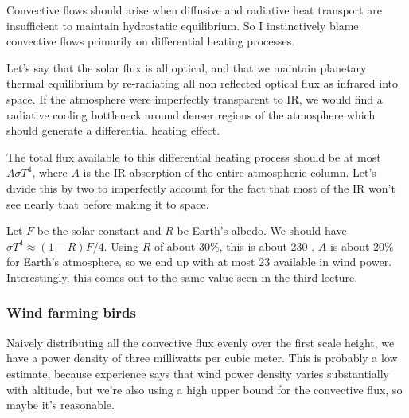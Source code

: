 \documentclass[12pt]{article}
\begin{document}
Convective flows should arise when diffusive and radiative heat transport are insufficient to maintain hydrostatic equilibrium. So I instinctively blame convective flows primarily on differential heating processes.

Let's say that the solar flux is all optical, and that we maintain planetary thermal equilibrium by re-radiating all non reflected optical flux as infrared into space. If the atmosphere were imperfectly transparent to IR, we would find a radiative cooling bottleneck around denser regions of the atmosphere which should generate a differential heating effect.

The total flux available to this differential heating process should be at most \(A \sigma T^4\), where \(A\) is the IR absorption of the entire atmospheric column. Let's divide this by two to imperfectly account for the fact that most of the IR won't see nearly that before making it to space.

Let \(F\) be the solar constant and \(R\) be Earth's albedo. We should have \(\sigma T^4 \approx (1-R)F/4\). Using \(R\) of about 30\%, this is about 230 \wmsq. \(A\) is about 20\% for Earth's atmosphere, so we end up with at most 23 \wmsq available in wind power. Interestingly, this comes out to the same value seen in the third lecture.

\subsubsection{Wind farming birds}

Naively distributing all the convective flux evenly over the first scale height, we have a power density of three milliwatts per cubic meter. This is probably a low estimate, because experience says that wind power density varies substantially with altitude, but we're also using a high upper bound for the convective flux, so maybe it's reasonable.









\end{document}
